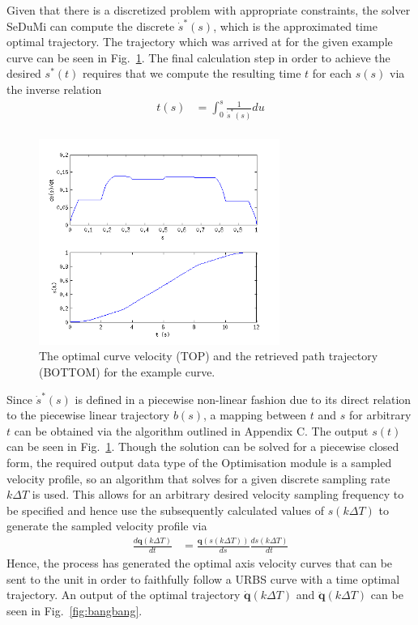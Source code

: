 Given that there is a discretized problem with appropriate constraints, the solver SeDuMi can compute the discrete $\dot{s}^*(s)$, which is the approximated time optimal trajectory. The trajectory which was arrived at for the given example curve can be seen in Fig.~\ref{fig:sdot_st}.
The final calculation step in order to achieve the desired $s^*(t)$ requires that we compute the resulting time $t$ for each $s(s)$ via the inverse relation
\begin{align*}
t(s) &= \int_0^s\frac{1}{\dot{s}^*(s)}du\\ 
\end{align*}

\begin{figure}[htbp]
\centering
\includegraphics[width=0.7\textwidth]{figures/optimisation/sdot_st.png}
\caption[$\dot{s}^*(s)$ and $s^*(t)$]{
The optimal curve velocity (TOP) and the retrieved path trajectory (BOTTOM) for the example curve.
\label{fig:sdot_st}}
\end{figure}

Since $\dot{s}^*(s)$ is defined in a piecewise non-linear fashion due to its direct relation to the piecewise linear trajectory $b(s)$, a mapping between $t$ and $s$ for arbitrary $t$ can be obtained via the algorithm outlined in Appendix C. The output $s(t)$ can be seen in Fig.~\ref{fig:sdot_st}. Though the solution can be solved for a piecewise closed form, the required output data type of the Optimisation module is a sampled velocity profile, so an algorithm that solves for a given discrete sampling rate $k\Delta T$ is used. This allows for an arbitrary desired velocity sampling frequency to be specified and hence use the subsequently calculated values of $s(k\Delta T)$ to generate the sampled velocity profile via 
\begin{align*}
\frac{d\textbf{q}\left(k \Delta T\right)}{dt} &= \frac{\textbf{q}\left(s(k\Delta T)\right)}{ds}\frac{ds(k\Delta T)}{dt}
\end{align*}
Hence, the process has generated the optimal axis velocity curves that can be sent to the unit in order to faithfully follow a URBS curve with a time optimal trajectory.
An output of the optimal trajectory $\dot{\textbf{q}}(k\Delta T)$ and $\ddot{\textbf{q}}(k\Delta T)$ can be seen in Fig.~\ref{fig:bangbang}.

